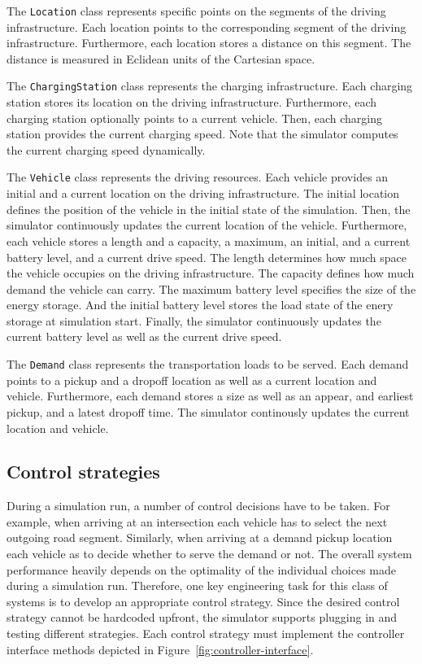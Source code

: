 \documentclass[10pt,twocolumn]{article}
\begin{document}
The \texttt{Location} class represents specific points on the segments of the driving infrastructure.
Each location points to the corresponding segment of the driving infrastructure.
Furthermore, each location stores a distance on this segment.
The distance is measured in Eclidean units of the Cartesian space.

The \texttt{ChargingStation} class represents the charging infrastructure.
Each charging station stores its location on the driving infrastructure.
Furthermore, each charging station optionally points to a current vehicle.
Then, each charging station provides the current charging speed.
Note that the simulator computes the current charging speed dynamically.

The \texttt{Vehicle} class represents the driving resources.
Each vehicle provides an initial and a current location on the driving infrastructure.
The initial location defines the position of the vehicle in the initial state of the simulation.
Then, the simulator continuously updates the current location of the vehicle.
Furthermore, each vehicle stores a length and a capacity, a maximum, an initial, and a current battery level, and a current drive speed.
The length determines how much space the vehicle occupies on the driving infrastructure.
The capacity defines how much demand the vehicle can carry.
The maximum battery level specifies the size of the energy storage.
And the initial battery level stores the load state of the enery storage at simulation start.
Finally, the simulator continuously updates the current battery level as well as the current drive speed.

The \texttt{Demand} class represents the transportation loads to be served.
Each demand points to a pickup and a dropoff location as well as a current location and vehicle.
Furthermore, each demand stores a size as well as an appear, and earliest pickup, and a latest dropoff time.
The simulator continously updates the current location and vehicle.

\subsection{Control strategies}
\label{sec:controller-interface}


During a simulation run, a number of control decisions have to be taken.
For example, when arriving at an intersection each vehicle has to select the next outgoing road segment.
Similarly, when arriving at a demand pickup location each vehicle as to decide whether to serve the demand or not.
The overall system performance heavily depends on the optimality of the individual choices made during a simulation run.
Therefore, one key engineering task for this class of systems is to develop an appropriate control strategy.
Since the desired control strategy cannot be hardcoded upfront, the simulator supports plugging in and testing different strategies.
Each control strategy must implement the controller interface methods depicted in Figure~\ref{fig:controller-interface}.
\end{document}
